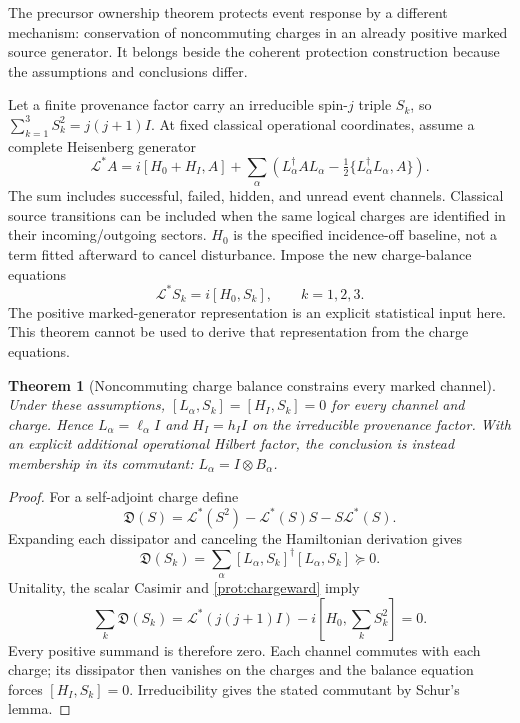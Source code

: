 \documentclass[11pt,oneside,openany]{book}
\newtheorem{theorem}{Theorem}[chapter]
\theoremstyle{definition}
\theoremstyle{remark}\newtheorem{remark}[theorem]{Remark}
\begin{document}
The precursor ownership theorem \cite{M04} protects event response by a different mechanism: conservation of noncommuting charges in an already positive marked source generator. It belongs beside the coherent protection construction because the assumptions and conclusions differ.

Let a finite provenance factor carry an irreducible spin-$j$ triple $S_k$, so $\sum_{k=1}^3S_k^2=j(j+1)I$. At fixed classical operational coordinates, assume a complete Heisenberg generator
\[
 \mathcal L^*A=i[H_0+H_I,A]
 +\sum_\alpha\left(L_\alpha^\dagger A L_\alpha
                  -\tfrac12\{L_\alpha^\dagger L_\alpha,A\}\right).
\]
The sum includes successful, failed, hidden, and unread event channels. Classical source transitions can be included when the same logical charges are identified in their incoming/outgoing sectors. $H_0$ is the specified incidence-off baseline, not a term fitted afterward to cancel disturbance. Impose the new charge-balance equations
\begin{equation}
 \mathcal L^*S_k=i[H_0,S_k],\qquad k=1,2,3.
 \label{prot:chargeward}
\end{equation}
The positive marked-generator representation is an explicit statistical input here. This theorem cannot be used to derive that representation from the charge equations.

\begin{theorem}[Noncommuting charge balance constrains every marked channel]
\label{prot:casimir}
Under these assumptions, $[L_\alpha,S_k]=[H_I,S_k]=0$ for every channel and charge. Hence $L_\alpha=\ell_\alpha I$ and $H_I=h_I I$ on the irreducible provenance factor. With an explicit additional operational Hilbert factor, the conclusion is instead membership in its commutant: $L_\alpha=I\otimes B_\alpha$.
\end{theorem}
\begin{proof}
For a self-adjoint charge define
\[
 \mathfrak D(S)=\mathcal L^*(S^2)-\mathcal L^*(S)S-S\mathcal L^*(S).
\]
Expanding each dissipator and canceling the Hamiltonian derivation gives
\[
 \mathfrak D(S_k)=\sum_\alpha[L_\alpha,S_k]^\dagger[L_\alpha,S_k]\succeq0.
\]
Unitality, the scalar Casimir and \eqref{prot:chargeward} imply
\[
 \sum_k\mathfrak D(S_k)
 =\mathcal L^*(j(j+1)I)-i[H_0,\sum_kS_k^2]=0.
\]
Every positive summand is therefore zero. Each channel commutes with each charge; its dissipator then vanishes on the charges and the balance equation forces $[H_I,S_k]=0$. Irreducibility gives the stated commutant by Schur's lemma.
\end{proof}
\end{document}

